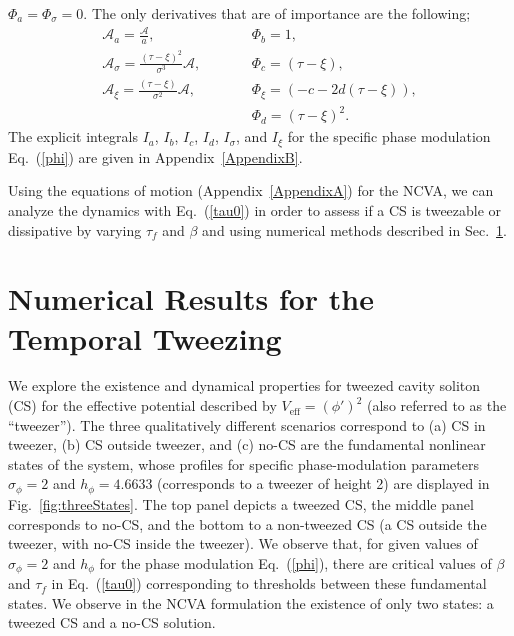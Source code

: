 $\Phi_a = \Phi_{\sigma} = 0$.  The only derivatives that are of importance are the following;
\begin{eqnarray}
\mathcal{A}_a = \frac{\mathcal{A}}{a}, \quad &&  \quad \Phi_b = 1,\nonumber \\
\mathcal{A}_{\sigma} = \frac{(\tau - \xi)^2}{\sigma^3} \mathcal{A}, \quad &&  \quad \Phi_c = (\tau-\xi), \nonumber \\
\mathcal{A}_{\xi} = \frac{(\tau-\xi)}{\sigma^2} \mathcal{A}, \quad&&   \quad \Phi_{\xi} = (-c - 2d(\tau - \xi)), \nonumber \\
&& \quad \Phi_d = (\tau- \xi)^2.  \nonumber 
\end{eqnarray}
The explicit integrals $I_a$, $I_b$, $I_c$, $I_d$, $I_{\sigma}$, and $I_{\xi}$ for the specific phase modulation Eq.~(\ref{phi}) are given in Appendix~\ref{AppendixB}.

Using the equations of motion (Appendix~\ref{AppendixA}) for the NCVA, we can analyze the dynamics with Eq.~(\ref{tau0}) in order to assess if a CS is tweezable or dissipative by varying $\tau_f$ and $\beta$ and using numerical methods described in Sec.~\ref{section:TweezeResults}.


\section[Numerical Results for the Temporal Tweezing]{Numerical Results for the Temporal Tweezing} \label{section:TweezeResults}
We explore the existence and dynamical properties for tweezed cavity soliton (CS) for the effective potential described by $V_{\mathrm{eff}} = (\phi')^2$ (also referred to as the ``tweezer'').   The three qualitatively different scenarios correspond to (a) CS in tweezer, (b) CS outside tweezer, and (c) no-CS are the fundamental nonlinear states of the system, whose profiles for specific phase-modulation parameters $\sigma_\phi = 2$ and $h_\phi=4.6633$ (corresponds to a tweezer of height 2) are displayed in Fig.~\ref{fig:threeStates}.  The top panel depicts a tweezed CS, the middle panel corresponds to no-CS, and the bottom to a non-tweezed CS (a CS outside the tweezer, with no-CS inside the tweezer).  We observe that, for given values of $\sigma_\phi = 2$ and $h_\phi$ for the phase modulation Eq.~(\ref{phi}), there are critical values of $\beta$ and $\tau_f$ in Eq.~(\ref{tau0}) corresponding to thresholds between these fundamental states.  We observe in the NCVA formulation the existence of only two states: a tweezed CS and a no-CS solution.  

